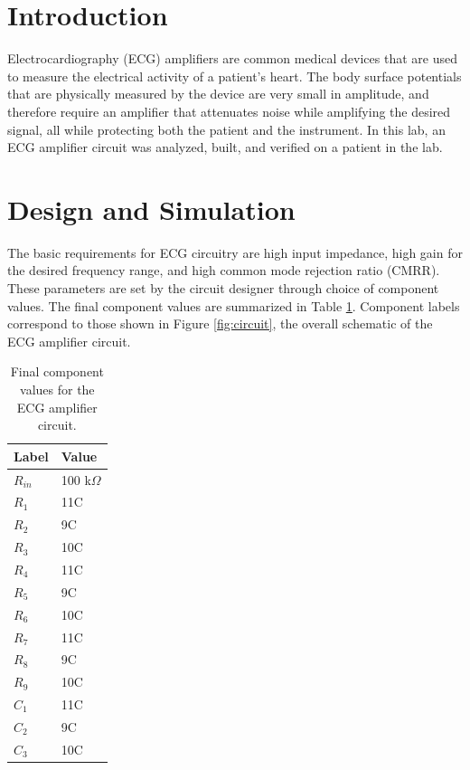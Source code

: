 \documentclass[pdftex,12pt,letterpaper]{article}
\begin{document}
\section{Introduction}

Electrocardiography (ECG) amplifiers are common  medical devices that are used to measure the electrical activity of a patient's heart. The body surface potentials that are physically measured by the device are very small in amplitude, and therefore require an amplifier that attenuates noise while amplifying the desired signal, all while protecting both the patient and the instrument. In this lab, an ECG amplifier circuit was analyzed, built, and verified on a patient in the lab.

\section{Design and Simulation}

The basic requirements for ECG circuitry are high input impedance, high gain for the desired frequency range, and high common mode rejection ratio (CMRR). These parameters are set by the circuit designer through choice of component values. The final component values are summarized in Table \ref{table:values}. Component labels correspond to those shown in Figure \ref{fig:circuit},  the overall schematic of the ECG amplifier circuit.


\begin{table}[H]
\begin{center}
    \begin{tabular}{ | l | l | }
    \hline
    Label & Value \\ \hline
    $R_{in}$ & 100 k$\Omega$ \\ \hline
    $R_1$ & 11C \\ \hline
    $R_2$ & 9C  \\ \hline
    $R_3$ & 10C  \\ \hline
    $R_4$ & 11C \\ \hline
    $R_5$ & 9C  \\ \hline
    $R_6$ & 10C  \\ \hline
    $R_7$ & 11C \\ \hline
    $R_8$ & 9C  \\ \hline
    $R_9$ & 10C  \\ \hline
    $C_1$ & 11C \\ \hline
    $C_2$ & 9C  \\ \hline
    $C_3$ & 10C  \\
    \hline
    \end{tabular}
    \caption{Final component values for the ECG amplifier circuit.}
    \label{table:values}
\end{center}
\end{table}
\end{document}
